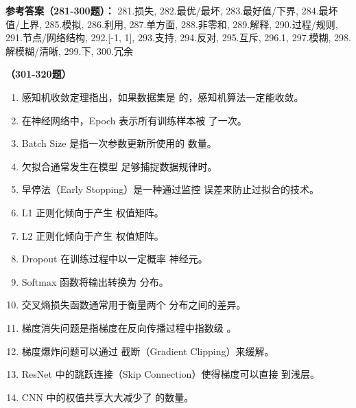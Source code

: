 \textbf{参考答案（281-300题）：}
281.损失, 282.最优/最坏, 283.最好值/下界, 284.最坏值/上界, 285.模拟, 286.利用, 287.单方面, 288.非零和, 289.解释, 290.过程/规则, 291.节点/网络结构, 292.[-1, 1], 293.支持, 294.反对, 295.互斥, 296.1, 297.模糊, 298.解模糊/清晰, 299.下, 300.冗余

\vspace{1em}
\textbf{（301-320题）}
\begin{enumerate}[resume,leftmargin=2em,itemsep=1pt]
\item 感知机收敛定理指出，如果数据集是 \underline{\hspace{3em}} 的，感知机算法一定能收敛。
\item 在神经网络中，Epoch 表示所有训练样本被 \underline{\hspace{3em}} 了一次。
\item Batch Size 是指一次参数更新所使用的 \underline{\hspace{3em}} 数量。
\item 欠拟合通常发生在模型 \underline{\hspace{3em}} 足够捕捉数据规律时。
\item 早停法（Early Stopping）是一种通过监控 \underline{\hspace{3em}} 误差来防止过拟合的技术。
\item L1 正则化倾向于产生 \underline{\hspace{3em}} 权值矩阵。
\item L2 正则化倾向于产生 \underline{\hspace{3em}} 权值矩阵。
\item Dropout 在训练过程中以一定概率 \underline{\hspace{3em}} 神经元。
\item Softmax 函数将输出转换为 \underline{\hspace{3em}} 分布。
\item 交叉熵损失函数通常用于衡量两个 \underline{\hspace{3em}} 分布之间的差异。
\item 梯度消失问题是指梯度在反向传播过程中指数级 \underline{\hspace{3em}}。
\item 梯度爆炸问题可以通过 \underline{\hspace{3em}} 截断（Gradient Clipping）来缓解。
\item ResNet 中的跳跃连接（Skip Connection）使得梯度可以直接 \underline{\hspace{3em}} 到浅层。
\item CNN 中的权值共享大大减少了 \underline{\hspace{3em}} 的数量。

\end{enumerate}
